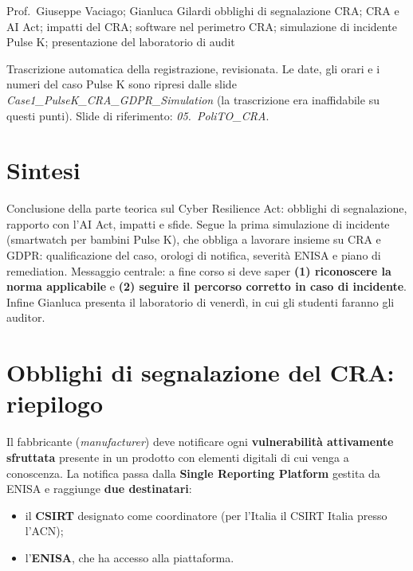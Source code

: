   {Prof.~Giuseppe Vaciago; Gianluca Gilardi}
  {obblighi di segnalazione CRA; CRA e AI Act; impatti del CRA; software nel perimetro CRA;
   simulazione di incidente Pulse K; presentazione del laboratorio di audit}
\label{lez:2026-11-02}

\begin{nota}[Fonte]
Trascrizione automatica della registrazione, revisionata. Le date, gli orari e i numeri del caso
Pulse K sono ripresi dalle slide \emph{Case1\_PulseK\_CRA\_GDPR\_Simulation} (la trascrizione era
inaffidabile su questi punti). Slide di riferimento: \emph{05.~PoliTO\_CRA}.
\end{nota}

\section{Sintesi}
Conclusione della parte teorica sul Cyber Resilience Act: obblighi di segnalazione, rapporto con
l'AI Act, impatti e sfide. Segue la prima simulazione di incidente (smartwatch per bambini Pulse K),
che obbliga a lavorare insieme su CRA e GDPR: qualificazione del caso, orologi di notifica,
severità ENISA e piano di remediation. Messaggio centrale: a fine corso si deve saper
\textbf{(1) riconoscere la norma applicabile} e \textbf{(2) seguire il percorso corretto in caso di
incidente}. Infine Gianluca presenta il laboratorio di venerdì, in cui gli studenti faranno gli auditor.

\section{Obblighi di segnalazione del CRA: riepilogo}

Il fabbricante (\emph{manufacturer}) deve notificare ogni \textbf{vulnerabilità attivamente
sfruttata} presente in un prodotto con elementi digitali di cui venga a conoscenza. La notifica
passa dalla \textbf{Single Reporting Platform} gestita da ENISA e raggiunge \textbf{due destinatari}:
\begin{itemize}
  \item il \textbf{CSIRT} designato come coordinatore (per l'Italia il CSIRT Italia presso l'ACN);
  \item l'\textbf{ENISA}, che ha accesso alla piattaforma.
\end{itemize}

